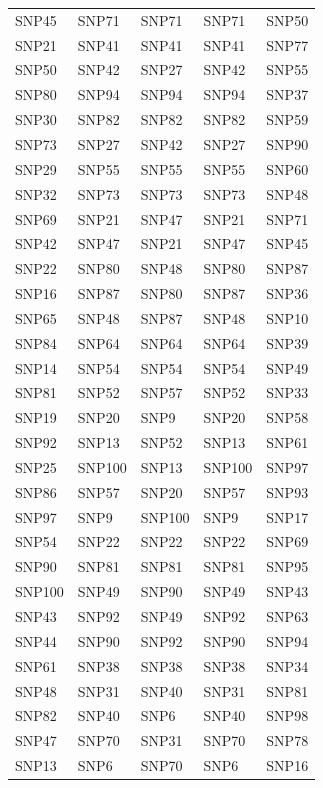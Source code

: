 \begin{table}[ht]
\begin{tabular}{lllll}
  SNP45 & SNP71 & SNP71 & SNP71 & SNP50 \\ 
  SNP21 & SNP41 & SNP41 & SNP41 & SNP77 \\ 
  SNP50 & SNP42 & SNP27 & SNP42 & SNP55 \\ 
  SNP80 & SNP94 & SNP94 & SNP94 & SNP37 \\ 
  SNP30 & SNP82 & SNP82 & SNP82 & SNP59 \\ 
  SNP73 & SNP27 & SNP42 & SNP27 & SNP90 \\ 
  SNP29 & SNP55 & SNP55 & SNP55 & SNP60 \\ 
  SNP32 & SNP73 & SNP73 & SNP73 & SNP48 \\ 
  SNP69 & SNP21 & SNP47 & SNP21 & SNP71 \\ 
  SNP42 & SNP47 & SNP21 & SNP47 & SNP45 \\ 
  SNP22 & SNP80 & SNP48 & SNP80 & SNP87 \\ 
  SNP16 & SNP87 & SNP80 & SNP87 & SNP36 \\ 
  SNP65 & SNP48 & SNP87 & SNP48 & SNP10 \\ 
  SNP84 & SNP64 & SNP64 & SNP64 & SNP39 \\ 
  SNP14 & SNP54 & SNP54 & SNP54 & SNP49 \\ 
  SNP81 & SNP52 & SNP57 & SNP52 & SNP33 \\ 
  SNP19 & SNP20 & SNP9 & SNP20 & SNP58 \\ 
  SNP92 & SNP13 & SNP52 & SNP13 & SNP61 \\ 
  SNP25 & SNP100 & SNP13 & SNP100 & SNP97 \\ 
  SNP86 & SNP57 & SNP20 & SNP57 & SNP93 \\ 
  SNP97 & SNP9 & SNP100 & SNP9 & SNP17 \\ 
  SNP54 & SNP22 & SNP22 & SNP22 & SNP69 \\ 
  SNP90 & SNP81 & SNP81 & SNP81 & SNP95 \\ 
  SNP100 & SNP49 & SNP90 & SNP49 & SNP43 \\ 
  SNP43 & SNP92 & SNP49 & SNP92 & SNP63 \\ 
  SNP44 & SNP90 & SNP92 & SNP90 & SNP94 \\ 
  SNP61 & SNP38 & SNP38 & SNP38 & SNP34 \\ 
  SNP48 & SNP31 & SNP40 & SNP31 & SNP81 \\ 
  SNP82 & SNP40 & SNP6 & SNP40 & SNP98 \\ 
  SNP47 & SNP70 & SNP31 & SNP70 & SNP78 \\ 
  SNP13 & SNP6 & SNP70 & SNP6 & SNP16 \\ 

\end{tabular}
\end{table}
